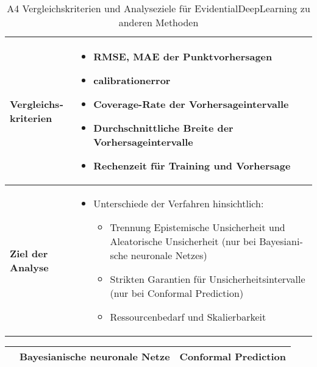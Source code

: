 \begin{otherlanguage}{ngerman}
\begin{table}[htbp]
\begin{tabularx}{\textwidth}{|l|X|}
  \multirow{7}{*}{\textbf{Vergleichskriterien}} &
  \begin{itemize}[topsep=0em, itemsep=0em, leftmargin=*, label={}]
    \item RMSE, MAE der Punktvorhersagen
    \item \gls{calibrationerror}
    \item Coverage-Rate der Vorhersageintervalle
    \item Durchschnittliche Breite der Vorhersageintervalle
    \item Rechenzeit für Training und Vorhersage
  \end{itemize}
  \\ \hline

  \multirow{6}{*}{\textbf{Ziel der Analyse}} &
  \begin{itemize}[topsep=0em, itemsep=0em, leftmargin=*, label={}]
    \item Unterschiede der Verfahren hinsichtlich:
      \begin{itemize}[topsep=0em, itemsep=0em, leftmargin=*, label={}]
        \item Trennung \gls{Epistemische Unsicherheit} und \gls{Aleatorische Unsicherheit} (nur bei \gls{Bayesianische neuronale Netze}s)
        \item Strikten Garantien für Unsicherheitsintervalle (nur bei \gls{Conformal Prediction})
        \item Ressourcenbedarf und Skalierbarkeit
      \end{itemize}
  \end{itemize}
  \\ \hline

  \end{tabularx}
  \caption{A4 Vergleichskriterien und Analyseziele für \gls{EvidentialDeepLearning} zu anderen Methoden}
  \label{tab:vergleichskriterien}
\end{table}





\begin{table}[!htpb]
  \centering
  \footnotesize
  \begin{tabularx}{\textwidth}{|>{\centering\arraybackslash}l|X|X|}
    \hline
      & \hspace{0.6em}\textbf{\gls{Bayesianische neuronale Netze}} & \hspace{0.6em}\textbf{\gls{Conformal Prediction}} \\
    \hline


\end{tabularx}
\end{table}
\end{otherlanguage}
